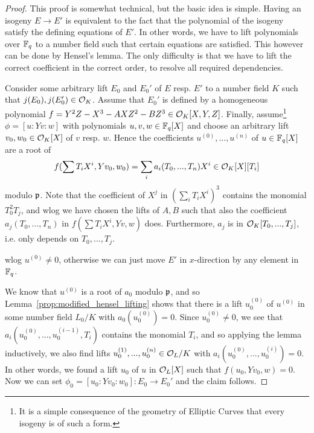 \begin{proof}
    This proof is somewhat technical, but the basic idea is simple.
    Having an isogeny $E \to E'$ is equivalent to the fact that the polynomial of the isogeny satisfy the defining equations of $E'$.
    In other words, we have to lift polynomials over $\mathbb{F}_q$ to a number field such that certain equations are satisfied.
    This however can be done by Hensel's lemma.
    The only difficulty is that we have to lift the correct coefficient in the correct order, to resolve all required dependencies.

    Consider some arbitrary lift $E_0$ and $E_0'$ of $E$ resp. $E'$ to a number field $K$ such that $j(E_0), j(E_0') \in \mathcal{O}_K$.
    Assume that $E_0'$ is defined by a homogeneous polynomial $f = Y^2Z - X^3 - AXZ^2 - BZ^3 \in \mathcal{O}_K[X, Y, Z]$.
    Finally, assume\footnote{It is a simple consequence of the geometry of Elliptic Curves that every isogeny is of such a form.} $\phi = [u : Y v : w]$ with polynomials $u, v, w \in \mathbb{F}_q[X]$ and choose an arbitrary lift $v_0, w_0 \in \mathcal{O}_K[X]$ of $v$ resp. $w$.
    Hence the coefficients $u^{(0)}, ..., u^{(n)}$ of $u \in \mathbb{F}_q[X]$ are a root of
    \begin{equation*}
        f(\sum T_i X^i, Y v_0, w_0) = \sum_i a_i(T_0, ..., T_n) X^i \in \mathcal{O}_K[X][T_i]
    \end{equation*}
    modulo $\mathfrak{p}$.
    Note that the coefficient of $X^j$ in $(\sum_i T_i X^i)^3$ contains the monomial $T_0^2 T_j$, and 
    wlog we have chosen the lifts of $A, B$ such that also the coefficient $a_j(T_0, ..., T_n)$ in $f(\sum T_i X^i, Y v, w)$ does.
    Furthermore, $a_j$ is in $\mathcal{O}_K[T_0, ..., T_j]$, i.e. only depends on $T_0, ..., T_j$.

    wlog $u^{(0)} \neq 0$, otherwise we can just move $E'$ in $x$-direction by any element in $\mathbb{F}_q$.

    We know that $u^{(0)}$ is a root of $a_0$ modulo $\mathfrak{p}$, and so Lemma~\ref{prop:modified_hensel_lifting} shows that there is a lift $u^{(0)}_0$ of $u^{(0)}$ in some number field $L_0/K$ with $a_0(u^{(0)}_0) = 0$.
    Since $u_0^{(0)} \neq 0$, we see that $a_i(u_0^{(0)}, ..., u_0^{(i - 1)}, T_i)$ contains the monomial $T_i$, and so applying the lemma inductively, we also find lifts $u^{(1)}_0, ..., u^{(n)}_0 \in \mathcal{O}_L/K$ with $a_i(u^{(0)}_0, ..., u^{(i)}_0) = 0$.
    In other words, we found a lift $u_0$ of $u$ in $\mathcal{O}_L[X]$ such that $f(u_0, Y v_0, w) = 0$.
    Now we can set $\phi_0 = [u_0 : Y v_0 : w_0]: E_0 \to E_0'$ and the claim follows.
\end{proof}
